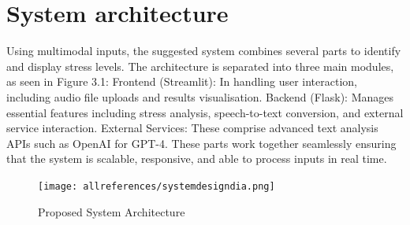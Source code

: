 \documentclass[Arial,12pt,openright,twoside]{book}
\begin{document}
\section{System architecture}
Using multimodal inputs, the suggested system combines several parts to identify and display stress levels. The architecture is separated into three main modules, as seen in Figure 3.1: 
Frontend (Streamlit): In handling user interaction, including audio file uploads and results visualisation.  
Backend (Flask): Manages essential features including stress analysis, speech-to-text conversion, and external service interaction. 
External Services: These comprise advanced text analysis APIs such as OpenAI for GPT-4. 
These parts work together seamlessly ensuring that the system is scalable, responsive, and able to process inputs in real time. 
\begin{figure}[h]
    \centering
    \texttt{[image: allreferences/systemdesigndia.png]}
    \caption{Proposed System Architecture}
    \label{fig:system_architecture}
\end{figure}
\end{document}
